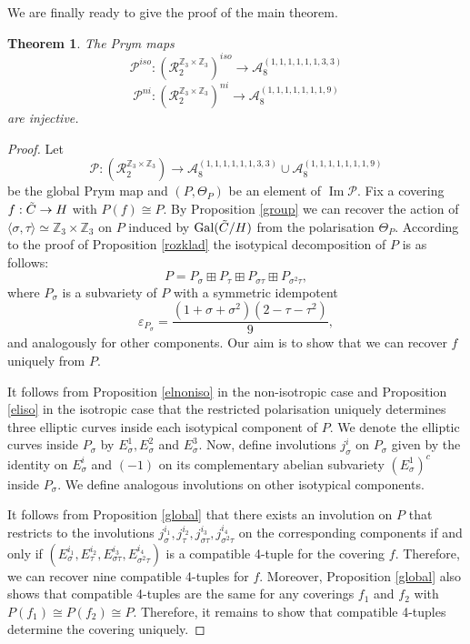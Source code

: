 \documentclass{amsart}
\newtheorem{thm}{Theorem}[section]
\theoremstyle{remark}
\numberwithin{equation}{section}
\newcommand{\cA}{\mathcal{A}}
\newcommand{\tC}{\Tilde{C}}
\DeclareMathOperator{\Gal}{Gal}
\DeclareMathOperator{\im}{Im}
\begin{document}
\vspace{3mm}

We are finally ready to give the proof of the main theorem.

\begin{thm}\label{mainthm}
    The Prym maps $$\mathcal{P}^{iso}:(\mathcal{R}_2^{\mathbb{Z}_3\times \mathbb{Z}_3})^{iso} \to \cA^{(1,1,1,1,1,1,3,3)}_8$$ 
    $$\mathcal{P}^{ni}:(\mathcal{R}_2^{\mathbb{Z}_3\times \mathbb{Z}_3})^{ni} \to\cA^{(1,1,1,1,1,1,1,9)}_8$$
    are injective.
\end{thm}

\begin{proof}
    
Let $$\mathcal{P}:(\mathcal{R}_2^{\mathbb{Z}_3\times \mathbb{Z}_3}) \to \cA^{(1,1,1,1,1,1,3,3)}_8 \cup \cA^{(1,1,1,1,1,1,1,9)}_8$$ be the global Prym map and $(P,\Theta_P)$ be an element of $\im\mathcal{P}$.
Fix a covering $f: \tC \to H$ with $P(f) \cong P$. By Proposition \ref{group} we can recover the action of $\langle \sigma, \tau \rangle \simeq \mathbb{Z}_3 \times \mathbb{Z}_3$ on $P$ induced by $\Gal(\tC/H)$ from the polarisation $\Theta_P$. According to the proof of Proposition \ref{rozklad} the isotypical decomposition of $P$ is as follows:
$$P = P_{\sigma} \boxplus P_{\tau} \boxplus P_{\sigma\tau} \boxplus P_{\sigma^2\tau},$$
where $P_{\sigma}$ is a subvariety of $P$ with a symmetric idempotent $$\varepsilon_{P_{\sigma}} = \frac{(1 + \sigma + \sigma^2)(2 - \tau - \tau^2)}{9},$$ and analogously for other components. Our aim is to show that we can recover $f$ uniquely from $P$.

It follows from Proposition \ref{elnoniso} in the non-isotropic case and Proposition \ref{eliso} in the isotropic case that the restricted polarisation uniquely determines three elliptic curves inside each isotypical component of $P$. We denote the elliptic curves inside $P_{\sigma}$ by $E_{\sigma}^1, E_{\sigma}^2$ and $E_{\sigma}^3$. Now, define involutions $j_{\sigma}^i$ on $P_{\sigma}$ given by the identity on $E_{\sigma}^i$ and $(-1)$ on its complementary abelian subvariety $(E_{\sigma}^1)^c$ inside $P_{\sigma}$. We define analogous involutions on other isotypical components.

It follows from Proposition \ref{global} that there exists an involution on $P$ that restricts to the involutions $j_{\sigma}^{i_1}, j_{\tau}^{i_2}, j_{\sigma\tau}^{i_3}, j_{\sigma^2\tau}^{i_4}$ on the corresponding components if and only if $(E_{\sigma}^{i_1}, E_{\tau}^{i_2}, E_{\sigma\tau}^{i_3}, E_{\sigma^2\tau}^{i_4})$ is a compatible 4-tuple for the covering $f$. Therefore, we can recover nine compatible 4-tuples for $f$.
Moreover, Proposition \ref{global} also shows that compatible 4-tuples are the same for any coverings $f_1$ and $f_2$ with $P(f_1) \cong P(f_2) \cong P$. Therefore, it remains to show that compatible 4-tuples determine the covering uniquely.  


\end{proof}
\end{document}
